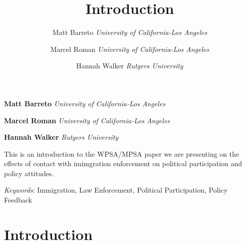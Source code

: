 \documentclass[10pt,]{article}
\title{Introduction  }
\author{\Large Matt Barreto\vspace{0.05in} \newline\normalsize\emph{University of California-Los Angeles}   \and \Large Marcel Roman\vspace{0.05in} \newline\normalsize\emph{University of California-Los Angeles}   \and \Large Hannah Walker\vspace{0.05in} \newline\normalsize\emph{Rutgers University}  }
\date{}
\newcommand*{\authorfont}{\fontfamily{phv}\selectfont}
\renewenvironment{abstract}
 {{%
    \setlength{\leftmargin}{0mm}
    \setlength{\rightmargin}{\leftmargin}%
  }%
  \relax}
 {\endlist}
\begin{document}
	
%

{%
\setlength{\parindent}{0pt}
\thispagestyle{plain}
{\fontsize{18}{20}\selectfont\raggedright 
\maketitle  %

}

{
   \vskip 13.5pt\relax \normalsize\fontsize{11}{12} 
\textbf{\authorfont Matt Barreto} \hskip 15pt \emph{\small University of California-Los Angeles}   \par \textbf{\authorfont Marcel Roman} \hskip 15pt \emph{\small University of California-Los Angeles}   \par \textbf{\authorfont Hannah Walker} \hskip 15pt \emph{\small Rutgers University}   

}

}








\begin{abstract}

    \hbox{\vrule height .2pt width 39.14pc}

    \vskip 8.5pt %

\noindent This is an introduction to the WPSA/MPSA paper we are presenting on the
effects of contact with imimgration enforcement on political
participation and policy attitudes.


\vskip 8.5pt \noindent \emph{Keywords}: Immigration, Law Enforcement, Political Participation, Policy Feedback \par

    \hbox{\vrule height .2pt width 39.14pc}



\end{abstract}


\vskip 6.5pt


\noindent \singlespacing \pagebreak

\doublespacing

\pagebreak

\section{Introduction}\label{introduction}
\end{document}
